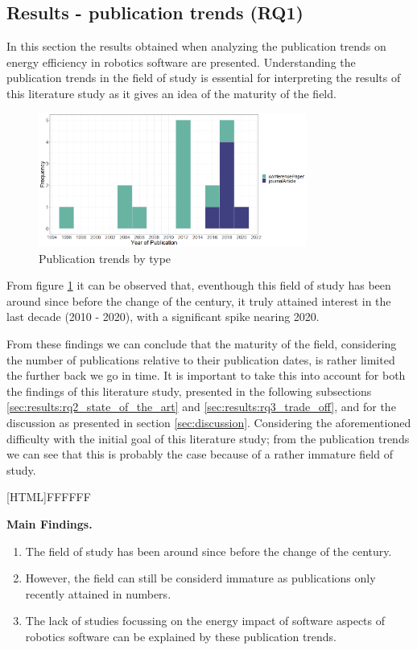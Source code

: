 \subsection{Results - publication trends (RQ1)}
\label{sec:results:rq1_pub_trends}

In this section the results obtained when analyzing the publication trends on energy efficiency in robotics software are presented.
Understanding the publication trends in the field of study is essential for interpreting the results of this literature study as it gives
an idea of the maturity of the field.

\begin{figure}
    \includegraphics[width=250pt]{figures/publication_trend_extended.png}
    \caption{Publication trends by type}
    \label{fig:pub_trends}
\end{figure}

From figure \ref{fig:pub_trends} it can be observed that, eventhough this field of study has been around since before the change of the century,
it truly attained interest in the last decade (2010 - 2020), with a significant spike nearing 2020.

From these findings we can conclude that the maturity of the field, considering the number of publications relative to their publication dates, 
is rather limited the further back we go in time. It is important to take this into account for both the findings of this literature study, presented in the following subsections 
\ref{sec:results:rq2_state_of_the_art} and \ref{sec:results:rq3_trade_off}, and for the discussion as presented in section \ref{sec:discussion}.
Considering the aforementioned difficulty with the initial goal of this literature study; from the publication trends we can see that this 
is probably the case because of a rather immature field of study.

\vspace{5mm}

\noindent{}[HTML]{FFFFFF}{\parbox{0.47\textwidth}{%
\noindent \textbf{Main Findings.}
\begin{enumerate}[nolistsep]
\item The field of study has been around since before the change of the century.
\item However, the field can still be considerd immature as publications only recently attained in numbers.
\item The lack of studies focussing on the energy impact of software aspects of robotics software can be explained by these publication trends.
\end{enumerate}}}

